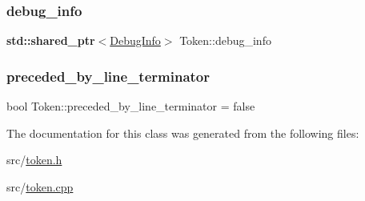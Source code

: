 \subsubsection{\texorpdfstring{debug\+\_\+info}{debug\_info}}
{\footnotesize\ttfamily \textbf{ std\+::shared\+\_\+ptr}$<$\hyperlink{struct_token_1_1_debug_info}{Debug\+Info}$>$ Token\+::debug\+\_\+info}

\mbox{\label{class_token_afac81ad105ee2e0ce26fa5c9adcf8e57}} 
\subsubsection{\texorpdfstring{preceded\+\_\+by\+\_\+line\+\_\+terminator}{preceded\_by\_line\_terminator}}
{\footnotesize\ttfamily bool Token\+::preceded\+\_\+by\+\_\+line\+\_\+terminator = false}



The documentation for this class was generated from the following files\+:\begin{DoxyCompactItemize}
\item 
src/\hyperlink{token_8h}{token.\+h}\item 
src/\hyperlink{token_8cpp}{token.\+cpp}\end{DoxyCompactItemize}
